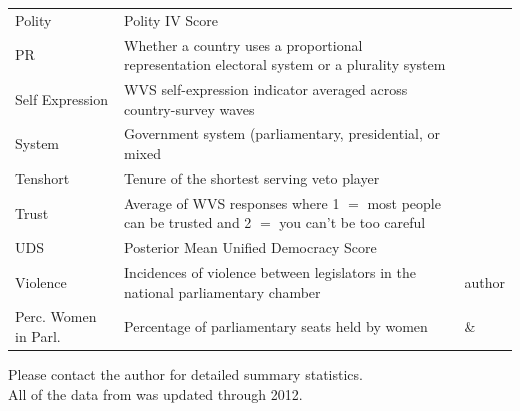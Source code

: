 \documentclass[a4paper]{article}\usepackage[]{graphicx}\usepackage[]{color}
\begin{document}
\begin{table}[!h]
\begin{center}
\begin{tabular}{l m{7cm} m{3.5cm}}
            Polity & Polity IV Score & \cite{Marshall2009} \\
            PR & Whether a country uses a proportional representation electoral system or a plurality system & \cite{DPI2001} \\
            Self Expression & WVS self-expression indicator averaged across country-survey waves & \cite{WVS2009} \\
            System & Government system (parliamentary, presidential, or mixed & \cite{DPI2001} \\
            Tenshort & Tenure of the shortest serving veto player & \cite{DPI2001} \\
            Trust & Average of WVS responses where 1 $=$ most people can be trusted and 2 $=$ you can't be too careful & \cite{WVS2009} \\
            UDS & Posterior Mean Unified Democracy Score & \cite{Pemstein2010} \\
            Violence & Incidences of violence between legislators in the national parliamentary chamber & author \\
            Perc. Women in Parl. & Percentage of parliamentary seats held by women & \cite{WomParCrossNat} \& \cite{IPU2013} \\
            \hline

    \end{tabular}
    \end{center}
    \begin{singlespace}
        Please contact the author for detailed summary statistics. \\
        All of the data from \cite{DPI2001} was updated through 2012.
    \end{singlespace}
\end{table}
\end{document}
